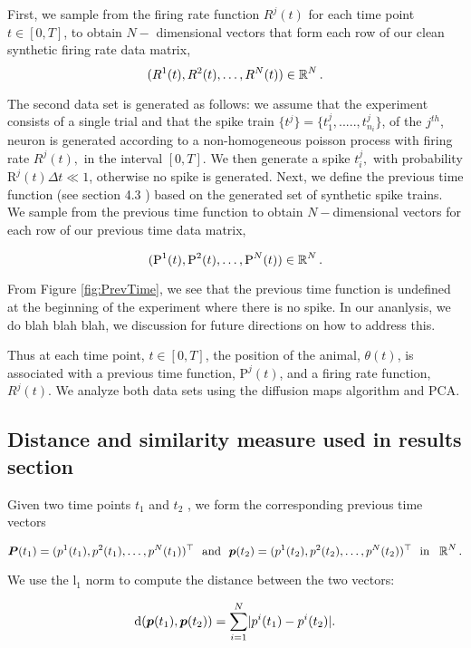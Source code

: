 First, we sample from the firing rate function  $R^{j}(t)$ for each time point $t \in [0, T]$,
to obtain $N-$ dimensional vectors  that form each row of our  clean synthetic firing rate data  matrix,
$$(R^{1}(t),  R^{2}(t),    \ldots , R^{N}(t) )  \in \operatorname{\mathbb{R}}^N. $$

The second data set is generated as follows: we assume that the experiment consists of a single trial and that the spike train  $\{ t^j \}   =  \{t_{1}^{j}, ....., t_{n_{i}}^{j} \} $, of the $j^{th}$, neuron is generated according to a non-homogeneous poisson process with firing rate  $R^{j}(t),$ in the interval $[0, T].$ We then generate a spike  $t^j_i,$ with probability $\text{R}^{j}(t)\Delta t \ll 1$, otherwise no spike is generated.  Next, we define the previous time function (see section 4.3 )  based on the  generated set of synthetic spike trains.  We sample from the previous time function to obtain 
$N-$dimensional vectors for each row of our previous time data matrix,

$$
( \text{P}^{1}(t), \text{P}^{2}(t), \ldots, \text{P}^{N}(t) ) \in  \operatorname{\mathbb{R}}^N.
$$

From Figure \ref{fig:PrevTime}, we  see that the previous time function is undefined at the beginning
of the experiment where there is no spike. In our ananlysis, we do blah blah blah, we discussion for future directions on how to address this.




Thus at each time point, $t  \in [0,T]$, the position of the animal, $\theta(t)$, is associated with a previous time function, $\text{P}^{j}(t)$, and a firing rate function, $R^{j}(t)$. We analyze both data sets using the diffusion maps algorithm  and  PCA.




\subsection{Distance  and similarity measure used in results section}
Given two time points $t_{1}$ and $t_{2}$ , we form the corresponding previous time vectors 

$$ \vect{P}(t_1)= (p^{1}(t_{1}), p^{2}(t_{1}), \ldots, p^{N}(t_{1}))^{\top}   \  \ \text{and} \  \ 
 \vect{p}(t_{2}) = (p^{1}(t_{2}), p^{2}(t_{2}), \ldots, p^{N}(t_{2}))^{\top} \  \ \text{in} \  \  \R^{N}.$$

We use the l$_{1}$ norm to compute the distance between the two vectors:

\begin{equation}\label{distPrevtime}
\text{d}(\boldsymbol{p}(t_{1}), \boldsymbol{p}(t_{2}) ) = 
\displaystyle \sum_{i=1}^{N} \lvert p^{i}(t_{1}) - p^{i}(t_{2})   \rvert.
\end{equation}

